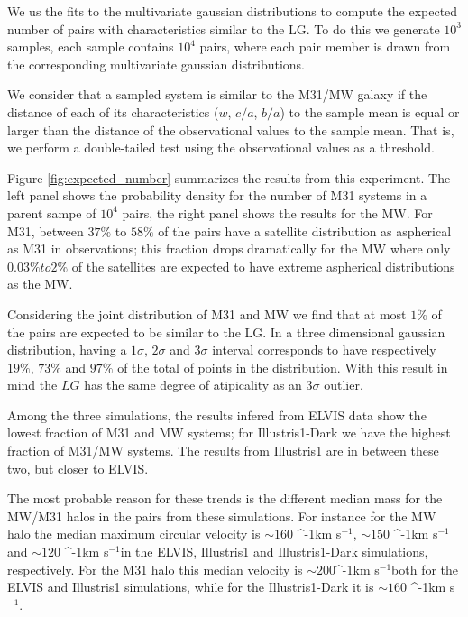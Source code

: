 \documentclass[a4paper,fleqn,usenatbib]{mnras}
\newcommand{\kms}{\ifmmode\mathrm{km\ s}^{-1}\else km s$^{-1}$\fi}
\begin{document}
We us the fits to the multivariate gaussian distributions to
compute the expected number of pairs with characteristics similar to
the LG.
To do this we generate $10^3$ samples, each sample contains $10^4$
pairs, where each pair member is drawn from the corresponding
multivariate gaussian distributions.  

We consider that a sampled system is similar to the M31/MW galaxy if the
distance of each of its characteristics ($w$, $c/a$, $b/a$) to the
sample mean is equal or larger than the distance of the observational
values to the sample mean.   
That is, we perform a double-tailed test using the observational
values as a threshold. 

Figure \ref{fig:expected_number} summarizes the results from this
experiment. 
The left panel shows the probability density for the number of M31
systems in a parent sampe of $10^4$ pairs, the right panel shows the
results for the MW.
For M31, between $37\%$ to $58\%$ of the pairs have a satellite
distribution as aspherical as M31 in observations; this fraction drops
dramatically for the MW where only $0.03\% to 2\%$ of the satellites
are expected to have extreme aspherical distributions as the MW.

Considering the joint distribution of M31 and MW we find that at most
$1\%$ of the pairs are expected to be similar to the LG.
In a three dimensional gaussian distribution, having a $1\sigma$,
$2\sigma$ and $3\sigma$ interval corresponds to have respectively $19 \%$, $73 \%$ and
$97 \%$ of the total of points in the distribution.
With this result in mind the $LG$ has the same degree of atipicality
as an $3\sigma$ outlier. 

Among the three simulations, the results infered from ELVIS data show
the lowest fraction of M31 and MW systems; for Illustris1-Dark we have
the highest fraction of M31/MW systems. The results from Illustris1
are in between these two, but closer to ELVIS.

The most probable reason for these trends is the different median mass
for the MW/M31 halos in the pairs from these simulations. 
For instance for the MW halo the median maximum circular velocity is
$\sim 160$ \kms, $\sim 150$ \kms and $\sim 120$ \kms in the ELVIS,
Illustris1 and Illustris1-Dark simulations, respectively.
For the M31 halo this median velocity is $\sim 200$\kms both for the
ELVIS and Illustris1 simulations, while for the Illustris1-Dark it is
$\sim 160$ \kms. 
\end{document}
